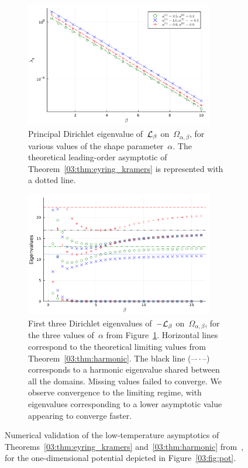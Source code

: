 \begin{figure}
    \centering
    \begin{subfigure}{0.9\textwidth}
        \includegraphics[width=0.9\textwidth]{figures/03/semiclassic/l1.pdf}
        \caption[]{Principal Dirichlet eigenvalue of~$\mathcal{L}_\beta$ on~$\Omega_{\alpha,\beta}$, for various values of the shape parameter~$\alpha$. The theoretical leading-order asymptotic of Theorem~\ref{03:thm:eyring_kramers} is represented with a dotted line.}
        \label{03:fig:ek}
    \end{subfigure}
    \hfill
\begin{subfigure}{0.9\textwidth}
    \includegraphics[width=0.9\textwidth]{figures/03/semiclassic/l2.pdf}
    \caption[]{First three Dirichlet eigenvalues of~$-\mathcal{L}_\beta$ on~$\Omega_{\alpha,\beta}$, for the three values of~$\alpha$ from Figure~\ref{03:fig:ek}. Horizontal lines correspond to the theoretical limiting values from Theorem~\ref{03:thm:harmonic}. The black line (--$\cdot\cdot$--) corresponds to a harmonic eigenvalue shared between all the domains. Missing values failed to converge. We observe convergence to the limiting regime, with eigenvalues corresponding to a lower asymptotic value appearing to converge faster.}
    \label{03:fig:harm}
\end{subfigure}
\caption[]{Numerical validation of the low-temperature asymptotics of Theorems~\ref{03:thm:eyring_kramers} and~\ref{03:thm:harmonic} from~\cite{BLS25a}, for the one-dimensional potential depicted in Figure~\ref{03:fig:pot}.}
\label{03:fig:semiclassic}
\end{figure}

